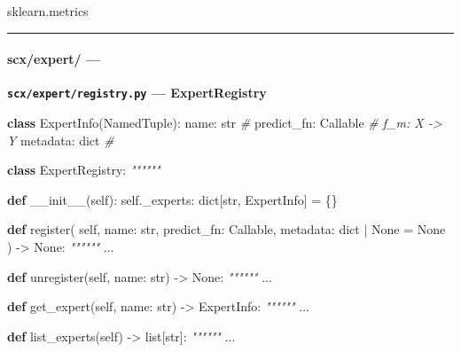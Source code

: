 \documentclass[
  12pt,
]{article}
\newenvironment{Shaded}{}{}
\newcommand{\BuiltInTok}[1]{\textcolor[rgb]{0.00,0.50,0.00}{#1}}
\newcommand{\CommentTok}[1]{\textcolor[rgb]{0.38,0.63,0.69}{\textit{#1}}}
\newcommand{\FunctionTok}[1]{\textcolor[rgb]{0.02,0.16,0.49}{#1}}
\newcommand{\KeywordTok}[1]{\textcolor[rgb]{0.00,0.44,0.13}{\textbf{#1}}}
\newcommand{\NormalTok}[1]{#1}
\newcommand{\OperatorTok}[1]{\textcolor[rgb]{0.40,0.40,0.40}{#1}}
\newcommand{\VariableTok}[1]{\textcolor[rgb]{0.10,0.09,0.49}{#1}}
\begin{document}
sklearn.metrics

\begin{center}\rule{0.5\linewidth}{0.5pt}\end{center}

\paragraph{scx/expert/ ---
}\label{scxexpert-ux4e13ux5bb6ux6a21ux5757}

\textbf{\texttt{scx/expert/registry.py} --- ExpertRegistry}



\begin{Shaded}
\begin{Highlighting}[]
\KeywordTok{class}\NormalTok{ ExpertInfo(NamedTuple):}
\NormalTok{    name: }\BuiltInTok{str}                              \CommentTok{\# }
\NormalTok{    predict\_fn: Callable                   }\CommentTok{\# f\_m: X {-}\textgreater{} Y }
\NormalTok{    metadata: }\BuiltInTok{dict}                         \CommentTok{\# }

\KeywordTok{class}\NormalTok{ ExpertRegistry:}
    \CommentTok{""""""}

    \KeywordTok{def} \FunctionTok{\_\_init\_\_}\NormalTok{(}\VariableTok{self}\NormalTok{):}
        \VariableTok{self}\NormalTok{.\_experts: }\BuiltInTok{dict}\NormalTok{[}\BuiltInTok{str}\NormalTok{, ExpertInfo] }\OperatorTok{=}\NormalTok{ \{\}}

    \KeywordTok{def}\NormalTok{ register(}
        \VariableTok{self}\NormalTok{, name: }\BuiltInTok{str}\NormalTok{,}
\NormalTok{        predict\_fn: Callable,}
\NormalTok{        metadata: }\BuiltInTok{dict} \OperatorTok{|} \VariableTok{None} \OperatorTok{=} \VariableTok{None}
\NormalTok{    ) }\OperatorTok{{-}\textgreater{}} \VariableTok{None}\NormalTok{:}
        \CommentTok{""""""}
\NormalTok{        ...}

    \KeywordTok{def}\NormalTok{ unregister(}\VariableTok{self}\NormalTok{, name: }\BuiltInTok{str}\NormalTok{) }\OperatorTok{{-}\textgreater{}} \VariableTok{None}\NormalTok{:}
        \CommentTok{""""""}
\NormalTok{        ...}

    \KeywordTok{def}\NormalTok{ get\_expert(}\VariableTok{self}\NormalTok{, name: }\BuiltInTok{str}\NormalTok{) }\OperatorTok{{-}\textgreater{}}\NormalTok{ ExpertInfo:}
        \CommentTok{""""""}
\NormalTok{        ...}

    \KeywordTok{def}\NormalTok{ list\_experts(}\VariableTok{self}\NormalTok{) }\OperatorTok{{-}\textgreater{}} \BuiltInTok{list}\NormalTok{[}\BuiltInTok{str}\NormalTok{]:}
        \CommentTok{""""""}
\NormalTok{        ...}


\end{Highlighting}
\end{Shaded}
\end{document}
